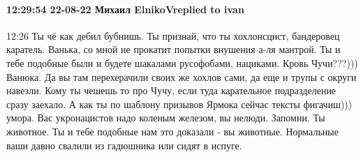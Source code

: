 
 
 
 
 

\paragraph{12:29:54 22-08-22 Михаил ElnikoVreplied to ivan}

12:26
Ты чё как дебил бубнишь. Ты признай, что ты хохлонсцист, бандеровец каратель. Ванька, со мной не прокатит попытки внушения а-ля мантрой.
Ты и тебе подобные были и будете шакалами русофобами, нациками.
Кровь Чучи???))) Ванюка. Да вы там перехерачили своих же хохлов сами, да еще и трупы с округи навезли. Кому ты чешешь то про Чучу, если туда карательное подразделение сразу заехало.
А как ты по шаблону призывов Ярмока сейчас тексты фигачиш))) умора.
Вас укронацистов надо коленым железом, вы нелюди. Запомни. Ты животное. Ты и тебе подобные нам это доказали - вы животные. Нормальные ваши давно свалили из гадюшника или сидят в испуге.
